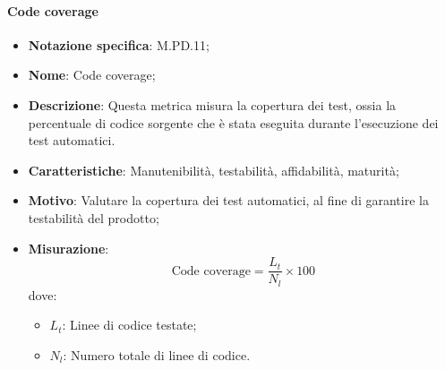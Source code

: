 \paragraph*{Code coverage}
\begin{itemize}
    \item \textbf{Notazione specifica}: M.PD.11;
    \item \textbf{Nome}: Code coverage;
    \item \textbf{Descrizione}: Questa metrica misura la copertura dei test, ossia la percentuale di codice sorgente che è stata eseguita durante l'esecuzione dei test automatici.
    \item \textbf{Caratteristiche}: Manutenibilità, testabilità, affidabilità, maturità;
    \item \textbf{Motivo}: Valutare la copertura dei test automatici, al fine di garantire la testabilità del prodotto;
    \item \textbf{Misurazione}: 
    \[
    \text{Code coverage} = \frac{L_{t}}{N_{l}} \times 100
    \]
    dove:
    \begin{itemize}
        \item $L_{t}$: Linee di codice testate;
        \item $N_{l}$: Numero totale di linee di codice.
    \end{itemize}
\end{itemize}
